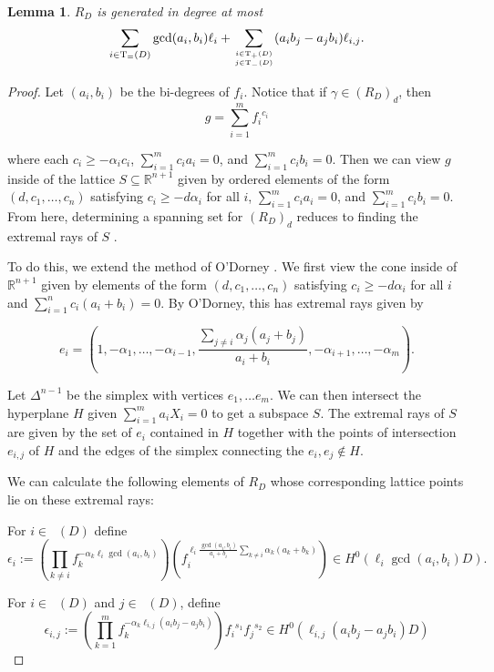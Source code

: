 \documentclass{amsart}
\theoremstyle{plain}
\newtheorem{lem}[thm]{Lemma}
\theoremstyle{definition}
\theoremstyle{remark}
\numberwithin{equation}{section}
\newcommand\bida{a}
\newcommand\bidb{b}
\DeclareMathOperator{\Te}{T_=}
\DeclareMathOperator{\Tp}{T_+}
\DeclareMathOperator{\Tm}{T_-}
\begin{document}
\begin{lem}\label{Hirzebruch-generators}
$R_D$ is generated in degree at most
\[
	\sum_{i\in \Te(D)} \gcd(\bida_i, \bidb_i) \ell_i + \sum_{i\in \Tp(D) \atop j\in \Tm(D)} (\bida_i \bidb_j- \bida_j \bidb_i)\ell_{i,j}.
\]
\end{lem}

\begin{proof}
Let $(\bida_i, \bidb_i)$ be the bi-degrees of $f_i$. Notice that if $\gamma
\in (R_D)_d$, then 
\[
	g = \sum_{i=1}^m {f_i}^{c_i}
\]

\noindent
where each $c_i \ge - \alpha_i c_i$, $\sum_{i=1}^m c_i \bida_i = 0$,
and $\sum_{i=1}^m c_i \bidb_i = 0$. Then we can view $g$ inside of the
lattice $S \subseteq \mathbb{R}^{n + 1}$ given by ordered elements of
the form $(d, c_1, \ldots, c_n)$ satisfying $c_i \ge - d \alpha_i$
for all $i$, $\sum_{i=1}^m c_i \bida_i = 0$, and $\sum_{i = 1}^m c_i \bidb_i =
 0$. From here, determining a spanning set for $(R_D)_d$ reduces to
finding the extremal rays of $S$ .

To do this, we extend the method of O'Dorney . We first
view the cone inside of $\mathbb{R}^{n+1}$ given by elements of the
form $(d, c_1, \ldots, c_n)$ satisfying $c_i \ge -d \alpha_i$ for
all $i$ and $\sum_{i = 1}^n c_i (\bida_i + \bidb_i) =0$. By O'Dorney, this
has extremal rays given by
 
\[
	e_i = (1, -\alpha_1, \ldots, -\alpha_{i-1}, \frac{\sum_{j \ne i}
	\alpha_j(\bida_j+ \bidb_j)}{\bida_i + \bidb_i}, -\alpha_{i + 1}, \ldots, - \alpha_m).
\]

Let $\Delta^{n-1}$ be the simplex with vertices $e_1, \ldots e_m$.
We can then intersect the hyperplane $H$ given $\sum_{i=1}^m \bida_i X_i
= 0$ to get a subspace $S$. The extremal rays of $S$ are given
by the set of $e_i$ contained in $H$ together with the points of
intersection $e_{i, j}$ of $H$ and the edges of the simplex
connecting the $e_i, e_j \not \in H$.

We can calculate the following elements of $R_D$ whose
corresponding lattice points lie on these extremal rays:

For $i \in \Te(D)$
define
\[
	\epsilon_i := (\prod_{k \ne i} f_k^{-\alpha_k \ell_i \gcd(\bida_i, \bidb_i)})
	(f_i^{\ell_i \frac{\gcd(\bida_i, \bidb_i)}{\bida_i + \bidb_i}\sum_{k \ne i}
	\alpha_k (\bida_k + \bidb_k)}) \in H^0(\ell_i \gcd(\bida_i, \bidb_i) D).
\]

For $i \in \Tp(D)$ and $j \in \Tm(D)$, define
\[
	\epsilon_{i, j} := (\prod_{k = 1}^m f_k^{-\alpha_k \ell_{i,j} (\bida_i \bidb_
j - \bida_j \bidb_i)}) {f_i}^{s_1} {f_j}^{s_2} \in H^0(\ell_{i,j}(\bida_i \bidb_j - 
\bida_j \bidb_i)D)
\]


\end{proof}
\end{document}
